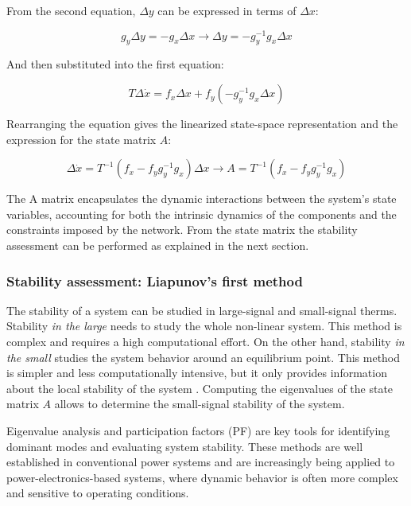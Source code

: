 From the second equation, $\Delta y$ can be expressed in terms of $\Delta x$:

\begin{equation}
    g_y\Delta y = -g_x \Delta x  \to \Delta y = - g_y^{-1} g_x \Delta x 
\end{equation}

And then substituted into the first equation:

\begin{equation}
    T \Delta \dot{x} = f_x\Delta x +f_y (- g_y^{-1} g_x  \Delta x) 
\end{equation}


Rearranging the equation gives the linearized state-space representation and the expression for the state matrix $A$:

\begin{equation}
    \Delta \dot{x} = T^{-1}(f_x-f_yg_y^{-1}g_x) \Delta x  \to A=T^{-1} (f_x-f_yg_y^{-1}g_x) 
\end{equation}


The A matrix encapsulates the dynamic interactions between the system's state variables, accounting for both the intrinsic dynamics of the components and the constraints imposed by the network. 
From the state matrix the stability assessment can be performed as explained in the next section.

\subsubsection{Stability assessment: Liapunov's first method}

The stability of a system can be studied in large-signal and small-signal therms. Stability \textit{in the large} needs to study the whole non-linear system. This method is complex and requires a high
computational effort. On the other hand, stability \textit{in the small} studies the system behavior around an equilibrium point. This method is simpler and less computationally intensive, but it only 
provides information about the local stability of the system \cite{StabilityAndControlKundur}. Computing the eigenvalues of the state matrix $A$ allows to determine the small-signal stability of the system.

Eigenvalue analysis and participation factors (PF) are key tools for identifying dominant modes and evaluating system stability. These methods are well established in conventional 
power systems and are increasingly being applied to power-electronics-based systems, where dynamic behavior is often more complex and sensitive to operating conditions.

